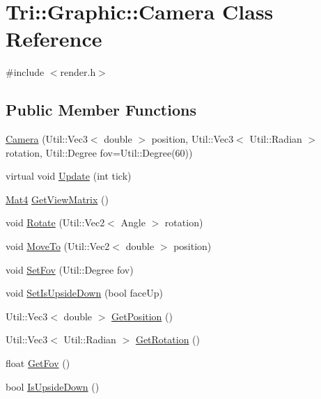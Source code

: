 \hypertarget{class_tri_1_1_graphic_1_1_camera}{}\section{Tri\+:\+:Graphic\+:\+:Camera Class Reference}
\label{class_tri_1_1_graphic_1_1_camera}


{\ttfamily \#include $<$render.\+h$>$}

\subsection*{Public Member Functions}
\begin{DoxyCompactItemize}
\item 
\hyperlink{class_tri_1_1_graphic_1_1_camera_aa2ba829b31e486b2028d6b517017e8cd}{Camera} (Util\+::\+Vec3$<$ double $>$ position, Util\+::\+Vec3$<$ Util\+::\+Radian $>$ rotation, Util\+::\+Degree fov=Util\+::\+Degree(60))
\item 
virtual void \hyperlink{class_tri_1_1_graphic_1_1_camera_aa68fd9c51d56bb999364a13c774998f4}{Update} (int tick)
\item 
\hyperlink{namespace_tri_1_1_graphic_a7b3538cdaff9bf96489c56a4f48a5f9a}{Mat4} \hyperlink{class_tri_1_1_graphic_1_1_camera_a0aa6799cf1a3541c3e17c010a4f65f99}{Get\+View\+Matrix} ()
\item 
void \hyperlink{class_tri_1_1_graphic_1_1_camera_a1b3bd9b5923e6d72db9521212fb8855d}{Rotate} (Util\+::\+Vec2$<$ Angle $>$ rotation)
\item 
void \hyperlink{class_tri_1_1_graphic_1_1_camera_a589dd8cde32e62172946f532c816d3c5}{Move\+To} (Util\+::\+Vec2$<$ double $>$ position)
\item 
void \hyperlink{class_tri_1_1_graphic_1_1_camera_abc66a18ab619979fc57858c0ec8262ed}{Set\+Fov} (Util\+::\+Degree fov)
\item 
void \hyperlink{class_tri_1_1_graphic_1_1_camera_afd94099a3837504a1a26c82687e1a1ae}{Set\+Is\+Upside\+Down} (bool face\+Up)
\item 
Util\+::\+Vec3$<$ double $>$ \hyperlink{class_tri_1_1_graphic_1_1_camera_ab65dc5d24d096e2b3da164d677c80412}{Get\+Position} ()
\item 
Util\+::\+Vec3$<$ Util\+::\+Radian $>$ \hyperlink{class_tri_1_1_graphic_1_1_camera_a9c212c2c5adc0ac98066801c2f88754c}{Get\+Rotation} ()
\item 
float \hyperlink{class_tri_1_1_graphic_1_1_camera_af300bae226e0213af31e97eaf2c13068}{Get\+Fov} ()
\item 
bool \hyperlink{class_tri_1_1_graphic_1_1_camera_a92e5b27f0204116e1fa75e37ade5e181}{Is\+Upside\+Down} ()
\end{DoxyCompactItemize}
